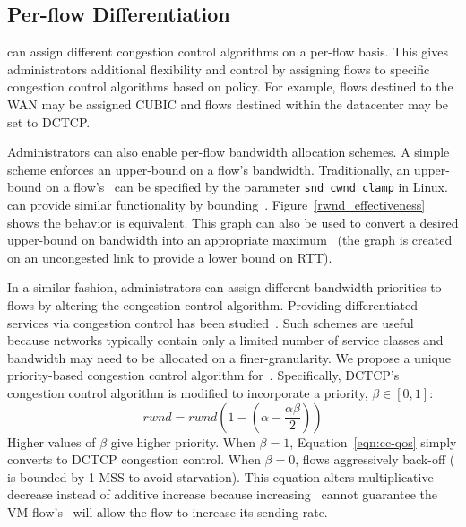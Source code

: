 \subsection{Per-flow Differentiation}
\label{ss:cc-qos}
\acdc{} can assign different congestion control algorithms
on a per-flow basis. This gives administrators additional flexibility and control by 
assigning flows to specific congestion control algorithms based on policy.
For example, flows destined to the WAN may be assigned CUBIC and flows destined within the
datacenter may be set to DCTCP. 

Administrators can also enable per-flow bandwidth allocation schemes.
A simple scheme enforces an upper-bound
on a flow's bandwidth. Traditionally, an upper-bound on a flow's~\cwnd{} can be
specified by the parameter {\tt snd\_cwnd\_clamp} in Linux.~\acdc{} can provide similar functionality
by bounding~\rwnd{}. Figure~\ref{rwnd_effectiveness} shows the behavior is equivalent. This 
graph can also be used to convert a desired upper-bound on bandwidth into an appropriate maximum~\rwnd{} (the
graph is created on an uncongested link to provide a lower bound on RTT). 

In a similar fashion, administrators can assign different bandwidth priorities to flows by altering the 
congestion control algorithm. Providing differentiated services via congestion control has 
been studied~\cite{Venkataramani2002tcpnice,shieh2011sharing}. Such schemes are useful because networks
typically contain only a limited number of service classes and bandwidth may need to be allocated on
a finer-granularity. We propose a unique priority-based congestion control algorithm for~\acdc{}.
Specifically, DCTCP's congestion control algorithm is modified to incorporate a priority, $\beta \in [0,1]$:
\begin{equation}
rwnd = rwnd (1 - (\alpha - \frac{\alpha{}\beta}{2}))
\label{eqn:cc-qos}
\end{equation}
Higher values of $\beta$ give higher priority. 
When $\beta{}=1$, Equation~\ref{eqn:cc-qos} simply converts to DCTCP congestion control. When
$\beta{}=0$, flows aggressively back-off (\rwnd{} is bounded by 1 MSS to avoid starvation). This equation
alters multiplicative decrease instead of additive increase because increasing~\rwnd{} 
cannot guarantee the VM flow's~\cwnd{} will allow the flow to increase its sending rate.

%
%
%


